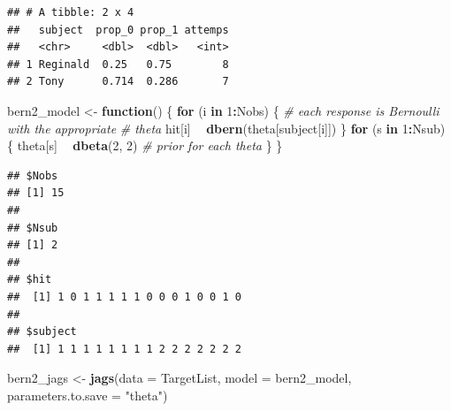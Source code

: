 \documentclass[
  12pt,
]{book}
\newenvironment{Shaded}{\begin{snugshade}}{\end{snugshade}}
\newcommand{\CommentTok}[1]{\textcolor[rgb]{0.56,0.35,0.01}{\textit{#1}}}
\newcommand{\ControlFlowTok}[1]{\textcolor[rgb]{0.13,0.29,0.53}{\textbf{#1}}}
\newcommand{\DataTypeTok}[1]{\textcolor[rgb]{0.13,0.29,0.53}{#1}}
\newcommand{\DecValTok}[1]{\textcolor[rgb]{0.00,0.00,0.81}{#1}}
\newcommand{\KeywordTok}[1]{\textcolor[rgb]{0.13,0.29,0.53}{\textbf{#1}}}
\newcommand{\NormalTok}[1]{#1}
\newcommand{\OperatorTok}[1]{\textcolor[rgb]{0.81,0.36,0.00}{\textbf{#1}}}
\newcommand{\StringTok}[1]{\textcolor[rgb]{0.31,0.60,0.02}{#1}}
\theoremstyle{definition}
\theoremstyle{definition}
\theoremstyle{definition}
\theoremstyle{remark}
\begin{document}
\begin{verbatim}
## # A tibble: 2 x 4
##   subject  prop_0 prop_1 attemps
##   <chr>     <dbl>  <dbl>   <int>
## 1 Reginald  0.25   0.75        8
## 2 Tony      0.714  0.286       7
\end{verbatim}

\begin{Shaded}
\begin{Highlighting}[]
\NormalTok{bern2_model <-}\StringTok{ }\ControlFlowTok{function}\NormalTok{() \{}
    \ControlFlowTok{for}\NormalTok{ (i }\ControlFlowTok{in} \DecValTok{1}\OperatorTok{:}\NormalTok{Nobs) \{}
        \CommentTok{# each response is Bernoulli with the appropriate}
        \CommentTok{# theta}
\NormalTok{        hit[i] }\OperatorTok{~}\StringTok{ }\KeywordTok{dbern}\NormalTok{(theta[subject[i]])}
\NormalTok{    \}}
    \ControlFlowTok{for}\NormalTok{ (s }\ControlFlowTok{in} \DecValTok{1}\OperatorTok{:}\NormalTok{Nsub) \{}
\NormalTok{        theta[s] }\OperatorTok{~}\StringTok{ }\KeywordTok{dbeta}\NormalTok{(}\DecValTok{2}\NormalTok{, }\DecValTok{2}\NormalTok{)  }\CommentTok{# prior for each theta}
\NormalTok{    \}}
\NormalTok{\}}
\end{Highlighting}
\end{Shaded}

\begin{Shaded}
\end{Shaded}

\begin{verbatim}
## $Nobs
## [1] 15
## 
## $Nsub
## [1] 2
## 
## $hit
##  [1] 1 0 1 1 1 1 1 0 0 0 1 0 0 1 0
## 
## $subject
##  [1] 1 1 1 1 1 1 1 1 2 2 2 2 2 2 2
\end{verbatim}

\begin{Shaded}
\begin{Highlighting}[]
\NormalTok{bern2_jags <-}\StringTok{ }\KeywordTok{jags}\NormalTok{(}\DataTypeTok{data =}\NormalTok{ TargetList, }\DataTypeTok{model =}\NormalTok{ bern2_model, }
    \DataTypeTok{parameters.to.save =} \StringTok{"theta"}\NormalTok{)}
\end{Highlighting}
\end{Shaded}
\end{document}
